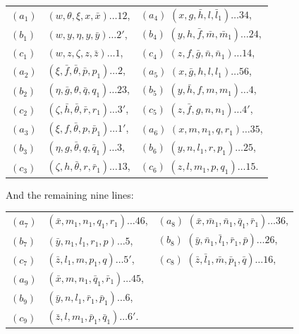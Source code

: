 \documentclass[11pt,a4paper]{book}
\begin{document}
\begin{center}
\begin{tabular}{lll}
$(a_1)$ & $(w, \theta, \xi, x, \bar{x}) \ldots 12$, & $(a_4)$ \quad $(x, g, \bar{h}, l, \bar{l}_1) \ldots 34$, \\
$(b_1)$ & $(w, y, \eta, y, \bar{y}) \ldots 2'$, & $(b_4)$ \quad $(y, h, \bar{f}, \bar{m}, \bar{m}_1) \ldots 24$, \\
$(c_1)$ & $(w, z, \zeta, z, \bar{z}) \ldots 1$, & $(c_4)$ \quad $(z, f, \bar{g}, \bar{n}, \bar{n}_1) \ldots 14$, \\
$(a_2)$ & $(\xi, \bar{f}, \bar{\theta}, \bar{p}, p_1) \ldots 2$, & $(a_5)$ \quad $(x, \bar{g}, h, l, l_1) \ldots 56$, \\
$(b_2)$ & $(\eta, \bar{g}, \theta, \bar{q}, q_1) \ldots 23$, & $(b_5)$ \quad $(y, \bar{h}, f, m, m_1) \ldots 4$, \\
$(c_2)$ & $(\zeta, \bar{h}, \bar{\theta}, \bar{r}, r_1) \ldots 3'$, & $(c_5)$ \quad $(z, \bar{f}, g, n, n_1) \ldots 4'$, \\
$(a_3)$ & $(\xi, f, \bar{\theta}, p, \bar{p}_1) \ldots 1'$, & $(a_6)$ \quad $(x, m, n_1, q, r_1) \ldots 35$, \\
$(b_3)$ & $(\eta, g, \bar{\theta}, q, \bar{q}_1) \ldots 3$, & $(b_6)$ \quad $(y, n, l_1, r, p_1) \ldots 25$, \\
$(c_3)$ & $(\zeta, h, \bar{\theta}, r, \bar{r}_1) \ldots 13$, & $(c_6)$ \quad $(z, l, m_1, p, q_1) \ldots 15$.
\end{tabular}
\end{center}

And the remaining nine lines:
\begin{center}
\begin{tabular}{lll}
$(a_7)$ & $(\bar{x}, m_1, n_1, q_1, r_1) \ldots 46$, & $(a_8)$ \quad $(\bar{x}, \bar{m}_1, \bar{n}_1, \bar{q}_1, \bar{r}_1) \ldots 36$, \\
$(b_7)$ & $(\bar{y}, n_1, l_1, r_1, p) \ldots 5$, & $(b_8)$ \quad $(\bar{y}, \bar{n}_1, \bar{l}_1, \bar{r}_1, \bar{p}) \ldots 26$, \\
$(c_7)$ & $(\bar{z}, l_1, m, p_1, q) \ldots 5'$, & $(c_8)$ \quad $(\bar{z}, \bar{l}_1, \bar{m}, \bar{p}_1, \bar{q}) \ldots 16$, \\
$(a_9)$ & $(\bar{x}, m, n_1, \bar{q}_1, \bar{r}_1) \ldots 45$, \\
$(b_9)$ & $(\bar{y}, n, l_1, \bar{r}_1, \bar{p}_1) \ldots 6$, \\
$(c_9)$ & $(\bar{z}, l, m_1, \bar{p}_1, \bar{q}_1) \ldots 6'$.
\end{tabular}
\end{center}
\end{document}
